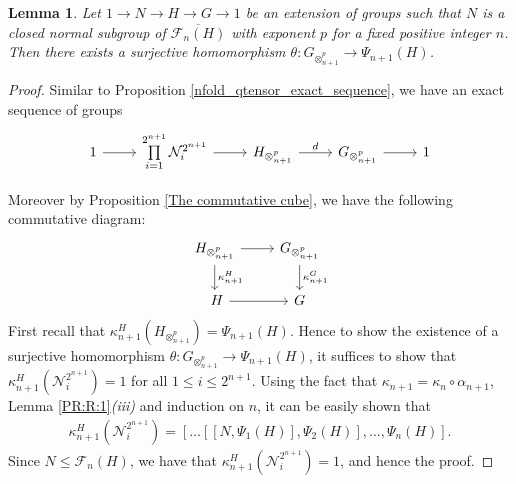 \documentclass[12pt]{elsarticle}
\newtheorem{lemma}[theorem]{Lemma}
\newtheorem*{main corollary*}{Main Corollary}
\theoremstyle{definition}
\newcommand{\ptens}{
	\otimes^p}
\begin{document}
  \begin{lemma}\label{Frattini exact sequence}
		Let $1 \to N \to H \to G \to 1$ be an extension of groups such that $N$ is a closed normal subgroup of $\overline{\mathcal{F}_n(H)}$ with exponent $p$ for a fixed positive integer $n$. Then there exists a surjective homomorphism ${\theta: G_{\otimes^{p}_{n+1}} \to \Psi_{n+1}(H)}$.
 \end{lemma}
 \begin{proof}
	Similar to Proposition \ref{nfold_qtensor_exact_sequence}, we have an exact sequence of groups
\[
     \begin{tikzcd}
         1 \arrow[r] & \prod \limits_{i=1}^{2^{n+1}} \mathcal{N}_i^{2^{n+1}} \arrow[r] & H_{\ptens_{n+1}} \arrow[r,"d"] & G_{\ptens_{n+1}} \arrow[r] & 1 
     \end{tikzcd}
\]
 
		Moreover by Proposition \ref{The commutative cube}, we have the following commutative diagram: 
\[			\begin{tikzcd} 
			H_{\ptens_{n+1}} \arrow[r]\arrow[d,"\kappa ^{H}_{n+1}"] & G_{\ptens_{n+1}} \arrow[d,"\kappa ^{G}_{n+1}"] 
			\\\ H \arrow[r]& G
			\end{tikzcd}
   \]
First recall that $\kappa_{n+1}^H(H_{\ptens_{n+1}})=\Psi_{n+1}(H)$. Hence to show the existence of a surjective homomorphism $\theta: G_{\otimes^{p}_{n+1}} \to \Psi_{n+1}(H)$, it suffices to show that $\kappa_{n+1}^H(\mathcal{N}_i^{2^{n+1}})=1$ for all $1\leq i\leq 2^{n+1}$. Using the fact that  ${\kappa_{n+1}=\kappa_n\circ \alpha_{n+1}}$, Lemma \ref{PR:R:1}\textit{(iii)} and induction on $n$, it can be easily shown that 
\begin{align*}
    \kappa_{n+1}^H(\mathcal{N}_i^{2^{n+1}})= [\ldots[[N,\Psi_1(H)],\Psi_2(H)],\ldots,\Psi_n(H)].
\end{align*} 
Since $N \leq \mathcal{F}_n(H)$, we have that   $\kappa_{n+1}^H(\mathcal{N}_i^{2^{n+1}})=1$, and hence the proof.
	\end{proof} 
\end{document}
